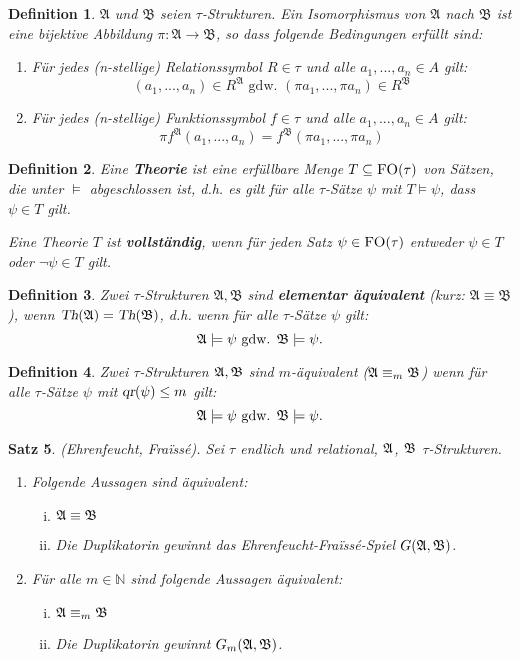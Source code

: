 \documentclass[12pt,a4paper]{article}
\newtheorem{defi}{Definition}[section]
\newtheorem{satz}[defi]{Satz}
\begin{document}
	\begin{defi}
		$\mathfrak{A}$ und $\mathfrak{B}$ seien $\tau$-Strukturen. Ein Isomorphismus von
$\mathfrak{A}$ nach $\mathfrak{B}$ ist eine bijektive Abbildung $\pi:\mathfrak{A} \rightarrow \mathfrak{B}$, so dass folgende Bedingungen erfüllt sind:
		\begin{enumerate}
			\item Für jedes (n-stellige) Relationssymbol $R \in \tau$ und alle $a_1,...,a_n \in A$ gilt:
$$
(a_1,...,a_n)\in R^\mathfrak{A} \text{ gdw. } (\pi a_1,..., \pi a_n) \in R^\mathfrak{B}
$$

\item Für jedes (n-stellige) Funktionssymbol $f \in \tau$ und alle $a_1,...,a_n \in A$ gilt:
$$
\pi f^\mathfrak{A}(a_1,...,a_n) = f^\mathfrak{B}(\pi a_1, ..., \pi a_n)
$$
		\end{enumerate}
	\end{defi}	
	
	\begin{defi}
		Eine \textbf{Theorie} ist eine erfüllbare Menge $T\subseteq\textsc{FO}(\tau)$ von Sätzen, die unter $\models$ abgeschlossen ist, d.h. es gilt für alle $\tau$-Sätze $\psi$ mit $T\models\psi$, dass $\psi\in T$ gilt.
		
		Eine Theorie $T$ ist \textbf{vollständig}, wenn für jeden Satz $\psi\in\textsc{FO}(\tau)$ entweder $\psi\in T$ oder $\neg\psi\in T$ gilt.
	\end{defi}
	\begin{defi}
		Zwei $\tau$-Strukturen $\mathfrak{A},\mathfrak{B}$ sind \textbf{elementar äquivalent} (kurz: $\mathfrak{A}\equiv\mathfrak{B}$), wenn $\textsl{Th}(\mathfrak{A})=\textsl{Th}(\mathfrak{B})$, d.h. wenn für alle $\tau$-Sätze $\psi$ gilt:
		\[\mathfrak{A}\models\psi\text{ gdw. }\mathfrak{B}\models\psi.\]
	\end{defi}
	\begin{defi}
		Zwei $\tau$-Strukturen $\mathfrak{A},\mathfrak{B}$ sind $m$-äquivalent ($\mathfrak{A}\equiv_m\mathfrak{B}$) wenn für alle $\tau$-Sätze $\psi$ mit $\textsl{qr}(\psi)\le m$ gilt:
		\[\mathfrak{A}\models\psi\text{ gdw. }\mathfrak{B}\models\psi.\]
	\end{defi}
	\begin{satz}
		(Ehrenfeucht, Fraïssé). Sei $\tau$ endlich und relational, $\mathfrak{A}$, $\mathfrak{B}$ $\tau$-Strukturen.
		\begin{enumerate}[(1)]
			\item Folgende Aussagen sind äquivalent:
			\begin{enumerate}[(i)]
				\item $\mathfrak{A}\equiv\mathfrak{B}$
				\item Die Duplikatorin gewinnt das Ehrenfeucht-Fraïssé-Spiel $G(\mathfrak{A},\mathfrak{B})$.
			\end{enumerate}
			\item Für alle $m\in\mathbb{N}$ sind folgende Aussagen äquivalent:
			\begin{enumerate}[(i)]
				\item $\mathfrak{A}\equiv_m\mathfrak{B}$
				\item Die Duplikatorin gewinnt $G_m(\mathfrak{A},\mathfrak{B})$.
			\end{enumerate}
		\end{enumerate}
	\end{satz}
\end{document}
